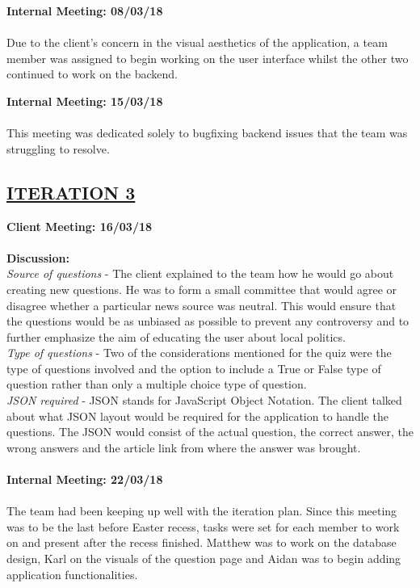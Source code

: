 \documentclass[paper=a4,fontsize=11pt]{article}
\newcommand{\sepspace}{\vspace*{1em}}		%
\newcommand{\sephalfspace}{\vspace*{0.3em}}		%
\newcommand{\SectionPart}[1]{\subsection*{\uppercase{#1}}}
\begin{document}
\hfill \textbf{Internal Meeting: 08/03/18}\\
\\
\noindent
Due to the client's concern in the visual aesthetics of the application, a team
member was assigned to begin working on the user interface whilst the other two continued to work on the backend.\\
\sephalfspace

\hfill \textbf{Internal Meeting: 15/03/18}\\
\\
\noindent
This meeting was dedicated solely to bugfixing backend issues that the team was struggling to resolve. \\
\sepspace

\SectionPart{\ul{Iteration 3}}
\hfill \textbf{Client Meeting: 16/03/18} \\
\\
\textbf{Discussion:}\\
\noindent
\textit{Source of questions} -
The client explained to the team how he would go about creating new questions.
He was to form a small committee that would agree or disagree whether a particular news source
was neutral. This would ensure that the questions would be as unbiased as possible to prevent any
controversy and to further emphasize the aim of educating the user about local politics.\\

\noindent
\textit{Type of questions} -
Two of the considerations mentioned for the quiz were the type of questions involved and the
option to include a True or False type of question rather than only a multiple choice type of
question.\\

\noindent
\textit{JSON required} -
JSON stands for JavaScript Object Notation. The client talked about what JSON layout would be
required for the application to handle the questions. The JSON would
consist of the actual question, the correct answer, the wrong answers and the article link
from where the answer was brought.\\\\

\hfill \textbf{Internal Meeting: 22/03/18}\\
\\
\noindent
The team had been keeping up well with the iteration plan. Since this meeting was to be
the last before Easter recess, tasks were set for each member to work on and present after the recess
finished. Matthew was to work on the database design, Karl on the visuals of the question page and Aidan
was to begin adding application functionalities.\\
\sepspace
\end{document}
